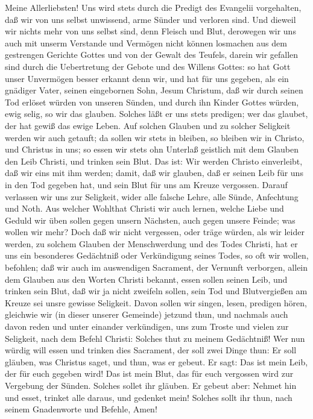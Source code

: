 Meine Allerliebsten! Uns wird stets durch die Predigt des Evangelii vorgehalten, daß wir von uns selbst unwissend, arme Sünder und verloren sind. Und dieweil wir nichts mehr von uns selbst sind, denn Fleisch und Blut, derowegen wir uns auch mit unserm Verstande und Vermögen nicht können losmachen aus dem gestrengen Gerichte Gottes und von der Gewalt des Teufels, darein wir gefallen sind durch die Uebertretung der Gebote und des Willens Gottes: so hat Gott unser Unvermögen besser erkannt denn wir, und hat für uns gegeben, als ein gnädiger Vater, seinen eingebornen Sohn, Jesum Christum, daß wir durch seinen Tod erlöset würden von unseren Sünden, und durch ihn Kinder Gottes würden, ewig selig, so wir das glauben. Solches läßt er uns stets predigen; wer das glaubet, der hat gewiß das ewige Leben. Auf solchen Glauben und zu solcher Seligkeit werden wir auch getauft; da sollen wir stets in bleiben, so bleiben wir in Christo, und Christus in uns; so essen
wir stets ohn Unterlaß geistlich mit dem Glauben den Leib Christi, und trinken sein Blut. Das ist: Wir werden Christo einverleibt, daß wir eins mit ihm werden; damit, daß wir glauben, daß er seinen Leib für uns in den Tod gegeben hat, und sein Blut für uns am Kreuze vergossen. Darauf verlassen wir uns zur Seligkeit, wider alle falsche Lehre, alle Sünde, Anfechtung und Noth. Aus welcher Wohlthat Christi wir auch lernen, welche Liebe und Geduld wir üben sollen gegen unsern Nächsten, auch gegen unsere Feinde; was wollen wir mehr? Doch daß wir nicht vergessen, oder träge würden, als wir leider werden, zu solchem Glauben der Menschwerdung und des Todes Christi, hat er uns ein besonderes Gedächtniß oder Verkündigung seines Todes, so oft wir wollen, befohlen; daß wir auch im auswendigen Sacrament, der Vernunft verborgen, allein dem Glauben aus den Worten Christi bekannt, essen sollen seinen Leib, und trinken sein Blut, daß wir ja nicht zweifeln sollen, sein Tod und Blutvergießen am Kreuze sei unsre gewisse Seligkeit. Davon sollen wir singen, lesen, predigen hören, gleichwie wir (in dieser unserer Gemeinde) jetzund thun, und nachmals auch davon reden und unter einander verkündigen, uns zum Troste und vielen zur Seligkeit, nach dem Befehl Christi: Solches thut zu meinem Gedächtniß! Wer nun würdig will essen und trinken dies Sacrament, der soll zwei Dinge thun: Er soll gläuben, was Christus saget, und thun, was er gebeut. Er sagt: Das ist mein Leib, der für euch gegeben wird! Das ist mein Blut, das für euch vergossen wird zur Vergebung der Sünden. Solches sollet ihr gläuben. Er gebeut aber: Nehmet hin und esset, trinket alle daraus, und gedenket mein! Solches sollt ihr thun, nach seinem Gnadenworte und Befehle, Amen!

